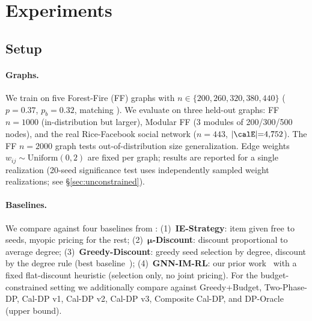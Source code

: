%

\section{Experiments}
\label{sec:experiments}

\subsection{Setup}
\label{sec:setup}

\paragraph{Graphs.}
We train on five Forest-Fire (FF) graphs with $n \in \{200, 260, 320, 380, 440\}$
($p{=}0.37$, $p_b{=}0.32$, matching \citet{babaei2013revenue}).
We evaluate on three held-out graphs: FF $n{=}1000$ (in-distribution but larger),
Modular FF (3 modules of 200/300/500 nodes), and the real
Rice-Facebook social network ($n{=}443$, $|\calE|{=}4{,}752$).
The FF $n{=}2000$ graph tests out-of-distribution size generalization.
Edge weights $w_{ij} \sim \mathrm{Uniform}(0, 2)$ are fixed per graph;
results are reported for a single realization (20-seed significance test uses
independently sampled weight realizations; see §\ref{sec:unconstrained}).

\paragraph{Baselines.}
We compare against four baselines from \citet{babaei2013revenue}:
(1)~\textbf{IE-Strategy}: item given free to seeds, myopic pricing for the rest;
(2)~$\bm{\mu}$\textbf{-Discount}: discount proportional to average degree;
(3)~\textbf{Greedy-Discount}: greedy seed selection by degree, discount by the
degree rule (best baseline~\citep{babaei2013revenue});
(4)~\textbf{GNN-IM-RL}: our prior work~\citep{anon_wsdm27} with a fixed
flat-discount heuristic (selection only, no joint pricing).
For the budget-constrained setting we additionally compare against
Greedy+Budget, Two-Phase-DP, Cal-DP v1, Cal-DP v2, Cal-DP v3,
Composite Cal-DP, and DP-Oracle (upper bound).

